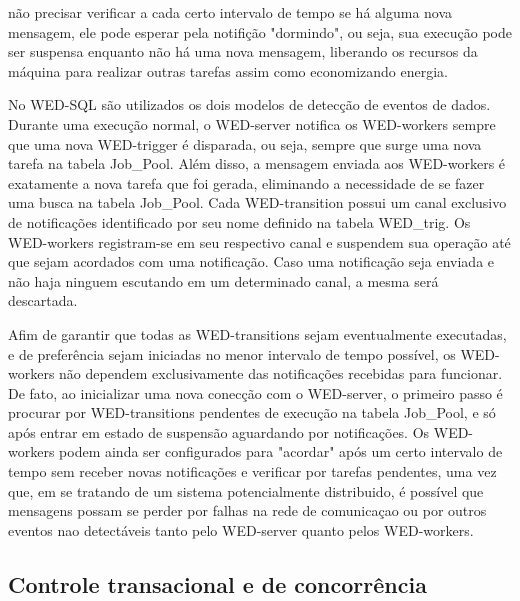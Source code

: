 \documentclass[conference]{IEEEtran}
\begin{document}
não precisar verificar a cada certo intervalo de tempo se há alguma nova mensagem, ele pode esperar pela notifição "dormindo", ou seja, sua execução
pode ser suspensa enquanto não há uma nova mensagem, liberando os recursos da máquina para realizar outras tarefas assim como economizando energia.
\par No WED-SQL são utilizados os dois modelos de detecção de eventos de dados. Durante uma execução normal, o WED-server notifica os WED-workers
sempre que uma nova WED-trigger é disparada, ou seja, sempre que surge uma nova tarefa na tabela Job\_Pool. Além disso, a mensagem enviada aos WED-workers
é exatamente a nova tarefa que foi gerada, eliminando a necessidade de se fazer uma busca na tabela Job\_Pool. Cada WED-transition possui um canal exclusivo
de notificações identificado por seu nome definido na tabela WED\_trig. Os WED-workers registram-se em seu respectivo canal e suspendem sua operação até
que sejam acordados com uma notificação. Caso uma notificação seja enviada e não haja ninguem escutando em um determinado canal, a mesma será descartada.
\par Afim de garantir que todas as WED-transitions sejam eventualmente executadas, e de preferência sejam iniciadas no menor intervalo de tempo possível, os
WED-workers não dependem exclusivamente das notificações recebidas para funcionar. De fato, ao inicializar uma nova conecção com o WED-server, o primeiro
passo é procurar por WED-transitions pendentes de execução na tabela Job\_Pool, e só após entrar em estado de suspensão aguardando por notificações. Os 
WED-workers podem ainda ser configurados para "acordar" após um certo intervalo de tempo sem receber novas notificações e verificar por tarefas pendentes,
uma vez que, em se tratando de um sistema potencialmente distribuido, é possível que mensagens possam se perder por falhas na rede de comunicaçao ou por
outros eventos nao detectáveis tanto pelo WED-server quanto pelos WED-workers. 
\par 




\subsection{Controle transacional e de concorrência}
\end{document}
